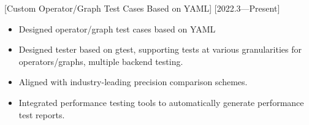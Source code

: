 \documentclass{resume}
\begin{document}
[Custom Operator/Graph Test Cases Based on YAML]
[2022.3—Present]

\begin{itemize}
  \item Designed operator/graph test cases based on YAML
  \item Designed tester based on gtest, supporting tests at various granularities for operators/graphs, multiple backend testing.
  \item Aligned with industry-leading precision comparison schemes.
  \item Integrated performance testing tools to automatically generate performance test reports.
\end{itemize}
\end{document}

